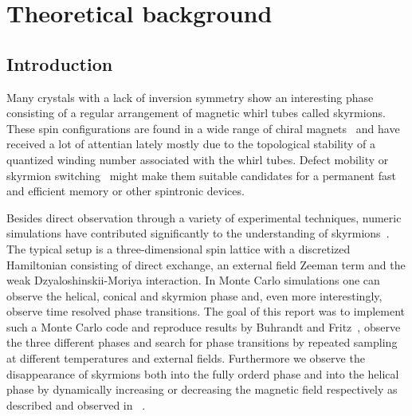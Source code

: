 %
\chapter{Theoretical background}\label{chap:1}
%

%
\section{Introduction}\label{sec:intro}
%
Many crystals with a lack of inversion symmetry show an interesting phase
consisting of a regular arrangement of magnetic whirl tubes called skyrmions.
These spin configurations are found in a wide range of  chiral
magnets~\cite{skyrm1, skyrm2, skyrm3, skyrm4, skyrm5, skyrm6, Milde, skyrm8,
skyrm9, skyrm10} and have received a lot of attentian lately mostly due to the
topological stability of a quantized winding number associated with the whirl
tubes. Defect mobility or skyrmion switching~\cite{switch} might make them
suitable candidates for a permanent fast and efficient memory or other
spintronic devices.

Besides direct observation through a variety of experimental techniques, numeric
simulations have contributed significantly to the understanding of
skyrmions~\cite{skyrmion, Milde, switch}. The typical setup is a
three-dimensional spin lattice with a discretized Hamiltonian consisting of
direct exchange, an external field Zeeman term and the weak
Dzyaloshinskii-Moriya interaction. In Monte Carlo simulations one can observe
the helical, conical and skyrmion phase and, even more interestingly, observe
time resolved phase transitions. The goal of this report was to implement such a
Monte Carlo code and reproduce results by Buhrandt and Fritz~\cite{skyrmion},
\ie{} observe the three different phases and search for phase transitions by
repeated sampling at different temperatures and external fields. Furthermore we
observe the disappearance of skyrmions both into the fully orderd phase and into
the helical phase by dynamically increasing or decreasing the magnetic field
respectively as described and observed in~\cite{Milde} .

